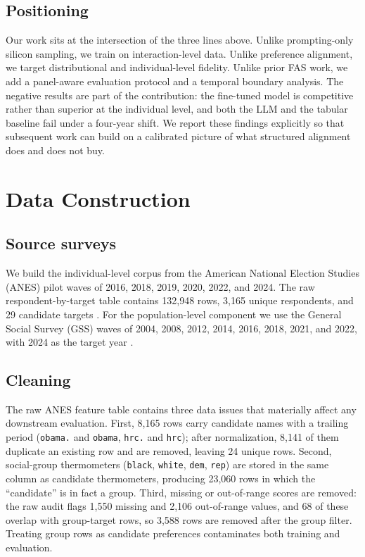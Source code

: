 \subsection{Positioning}\label{positioning}

Our work sits at the intersection of the three lines above. Unlike
prompting-only silicon sampling, we train on interaction-level data.
Unlike preference alignment, we target distributional and
individual-level fidelity. Unlike prior FAS work, we add a panel-aware
evaluation protocol and a temporal boundary analysis. The negative
results are part of the contribution: the fine-tuned model is
competitive rather than superior at the individual level, and both the
LLM and the tabular baseline fail under a four-year shift. We report
these findings explicitly so that subsequent work can build on a
calibrated picture of what structured alignment does and does not buy.

\section{Data Construction}\label{data-construction}

\subsection{Source surveys}\label{source-surveys}

We build the individual-level corpus from the American National Election
Studies (ANES) pilot waves of 2016, 2018, 2019, 2020, 2022, and 2024.
The raw respondent-by-target table contains 132,948 rows, 3,165 unique
respondents, and 29 candidate targets \citep{anesdata}. For the
population-level component we use the General Social Survey (GSS) waves
of 2004, 2008, 2012, 2014, 2016, 2018, 2021, and 2022, with 2024 as the
target year \citep{gssdata}.

\subsection{Cleaning}\label{cleaning}

The raw ANES feature table contains three data issues that materially
affect any downstream evaluation. First, 8,165 rows carry candidate
names with a trailing period (\texttt{obama.} and \texttt{obama},
\texttt{hrc.} and \texttt{hrc}); after normalization, 8,141 of them
duplicate an existing row and are removed, leaving 24 unique rows.
Second, social-group thermometers (\texttt{black}, \texttt{white},
\texttt{dem}, \texttt{rep}) are stored in the same column as candidate
thermometers, producing 23,060 rows in which the ``candidate'' is in
fact a group. Third, missing or out-of-range scores are removed: the raw
audit flags 1,550 missing and 2,106 out-of-range values, and 68 of these
overlap with group-target rows, so 3,588 rows are removed after the
group filter. Treating group rows as candidate preferences contaminates
both training and evaluation.


